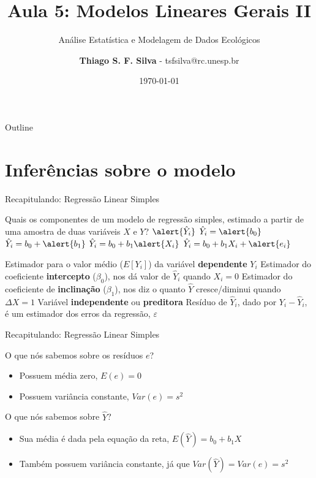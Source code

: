 \documentclass{beamer}\usepackage[]{graphicx}\usepackage[]{color}
\title{Aula 5: Modelos Lineares Gerais II}
\subtitle{Análise Estatística e Modelagem de Dados Ecológicos}
\author{\textbf{Thiago S. F. Silva} - tsfsilva@rc.unesp.br}
\institute{Programa de Pós Graduação em Ecologia e Biodiversidade - UNESP}
\date{\today}
\begin{document}
\begin{frame}[plain] %
  \titlepage
\end{frame}

\begin{frame}{Outline}
  \tableofcontents
\end{frame}

\section{Inferências sobre o modelo}


\begin{frame}{Recapitulando: Regressão Linear Simples}

Quais os componentes de um modelo de regressão simples, estimado a partir de uma amostra de duas variáveis $X$ e $Y$?
\vfill
\centering
{} {$\alert{\hat Y_i}$}
 {$\hat Y_i = \alert{b_0}$}
 {$\hat Y_i = b_0 + \alert{b_1}$}
 {$\hat Y_i = b_0 + b_1\alert{X_i}$}
 {$\hat Y_i = b_0 + b_1X_i + \alert{e_i}$}

\vfill

 {Estimador para o valor médio ($E[Y_i]$) da variável \textbf{dependente} $Y_i$}
 {Estimador do coeficiente \textbf{intercepto} ($\beta _0$), nos dá valor de $\hat Y_i$ quando $X_i=0$}
 {Estimador do coeficiente de \textbf{inclinação} ($\beta _1$), nos diz o quanto $\hat Y$ cresce/diminui quando $\Delta X=1$}
 {Variável \textbf{independente} ou \textbf{preditora}}
 {Resíduo de $\hat Y_i$, dado por $Y_i - \hat Y_i$, é um estimador dos erros da regressão, $\varepsilon$}


\end{frame}


\begin{frame}{Recapitulando: Regressão Linear Simples}

O que nós sabemos sobre os resíduos $e$? \pause
\vfill
\begin{itemize}
  \item Possuem média zero, $E(e) = 0$ \pause
  \item Possuem variância constante, $Var(e) = s^2$ \pause
\end{itemize}  
\vfill
O que nós sabemos sobre $\hat Y$? \pause
\vfill
\begin{itemize}
  \item Sua média é dada pela equação da reta, $E(\hat Y) = b_0 + b_1X$ \pause
  \item Também possuem variância constante, já que $Var(\hat Y) = Var(e) = s^2$
\end{itemize}  

\end{frame}
\end{document}
